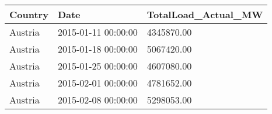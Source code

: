 \begin{tabular}{lll}
\toprule
Country & Date & TotalLoad\_Actual\_MW \\
\midrule
Austria & 2015-01-11 00:00:00 & 4345870.00 \\
Austria & 2015-01-18 00:00:00 & 5067420.00 \\
Austria & 2015-01-25 00:00:00 & 4607080.00 \\
Austria & 2015-02-01 00:00:00 & 4781652.00 \\
Austria & 2015-02-08 00:00:00 & 5298053.00 \\
\bottomrule
\end{tabular}
